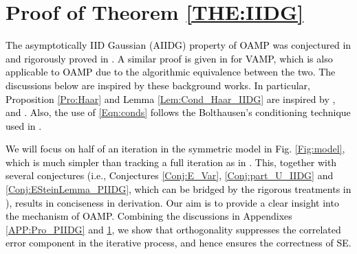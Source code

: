 \documentclass[journal]{IEEEtran}
\newcommand{\LL}[1]{\textcolor{black}{#1}}
\begin{document}
\section{Proof of Theorem \ref{THE:IIDG}}\label{Sec:IIDG_proof} 
\LL{The asymptotically IID Gaussian (AIIDG) property of OAMP was conjectured in \cite{Ma2016} and rigorously proved in \cite{Takeuchi2017, Takeuchi2019}. A similar proof is given in \cite{Rangan2016} for VAMP, which is also applicable to OAMP due to the algorithmic equivalence between the two. The discussions below are inspired by these background works. In particular,  Proposition \ref{Pro:Haar} and Lemma \ref{Lem:Cond_Haar_IIDG} are inspired by \cite[Lemmas 3 and 5]{Rangan2016}, \cite[Lemmas 1 and 3]{Takeuchi2017} and \cite[Lemmas 1 and 3]{Takeuchi2019}. Also, the use of \eqref{Eqn:conds} follows the Bolthausen’s conditioning technique used in \cite{Rangan2016, Takeuchi2017, Takeuchi2019}.}

\LL{We will focus on half of an iteration in the symmetric model in Fig. \ref{Fig:model}, which is much simpler than tracking a full iteration as in \cite{Rangan2016, Takeuchi2017, Takeuchi2019}. This, together with several conjectures (i.e., Conjectures \ref{Conj:E_Var}, \ref{Conj:part_U_IIDG} and \ref{Conj:ESteinLemma_PIIDG}, which can be bridged by the rigorous treatments in \cite{Rangan2016, Takeuchi2017, Takeuchi2019}), results in conciseness in derivation. Our aim is to provide a clear insight into the mechanism of OAMP. Combining the discussions in Appendixes \ref{APP:Pro_PIIDG} and \ref{Sec:IIDG_proof}, we show that orthogonality suppresses the correlated error component in the iterative process, and hence ensures the correctness of SE.}




\end{document}
